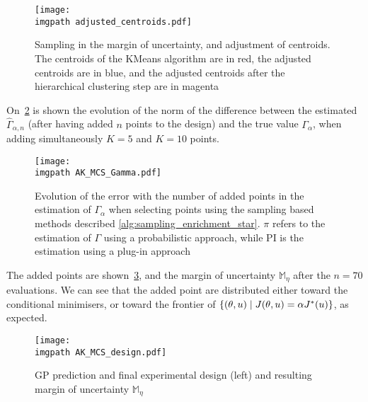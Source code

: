 \documentclass[../../Main_ManuscritThese.tex]{subfiles}
\newcommand\imgpath{/home/victor/acadwriting/Manuscrit/Text/Chapter4/img/}
\begin{document}
\begin{figure}[ht]
  \centering
  \texttt{[image: \\imgpath adjusted\_centroids.pdf]}
  \caption[Full batch iteration with double
  adjustment]{\label{fig:adjusted_centroids} Sampling in the margin of
    uncertainty, and adjustment of centroids. The centroids of the
    KMeans algorithm are in red, the adjusted centroids are in blue,
    and the adjusted centroids after the hierarchical clustering step
    are in magenta}
\end{figure}

On~\cref{fig:AK_MCS_Gamma} is shown the evolution of the norm of the
difference between the estimated $\hat{\Gamma}_{\alpha,n}$ (after
having added $n$ points to the design) and the true value
$\Gamma_{\alpha}$, when adding simultaneously $K=5$ and $K=10$ points.

\begin{figure}[ht]
  \centering
  \texttt{[image: \\imgpath AK\_MCS\_Gamma.pdf]}
  \caption[Error in the estimation of $\Gamma_{\alpha}$ using a
  sampling-based method]{\label{fig:AK_MCS_Gamma} Evolution of the
    error with the number of added points in the estimation of
    $\Gamma_{\alpha}$ when selecting points using the sampling based
    methods described \cref{alg:sampling_enrichment_star}. $\pi$
    refers to the estimation of $\Gamma$ using a probabilistic
    approach, while $\mathrm{PI}$ is the estimation using a plug-in
    approach}
\end{figure}
The added points are shown~\cref{fig:AK_MCS_design}, and the margin of
uncertainty $\mathbb{M}_{\eta}$ after the $n=70$ evaluations. We can
see that the added point are distributed either toward the conditional
minimisers, or toward the frontier of
$\{(\theta, u) \mid J(\theta, u) = \alpha J^*(u)\}$, as expected.
\begin{figure}[ht]
  \centering
  \texttt{[image: \\imgpath AK\_MCS\_design.pdf]}
  \caption[GP prediction, final experimental design and margin of uncertainty]{\label{fig:AK_MCS_design} GP prediction and final
    experimental design (left) and resulting margin of uncertainty
    $\mathbb{M}_{\eta}$}
\end{figure}
\end{document}
